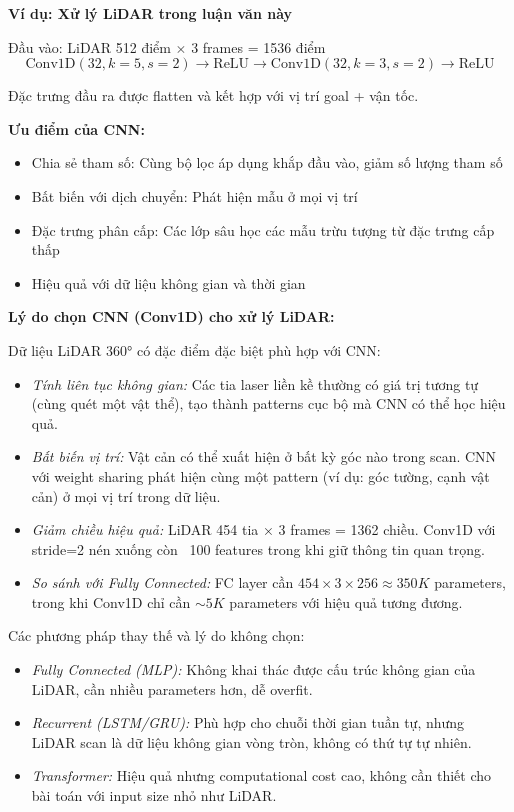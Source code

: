 \textbf{Ví dụ: Xử lý LiDAR trong luận văn này}

Đầu vào: LiDAR 512 điểm $\times$ 3 frames = 1536 điểm
\begin{equation}
\text{Conv1D}(32, k=5, s=2) \rightarrow \text{ReLU} \rightarrow \text{Conv1D}(32, k=3, s=2) \rightarrow \text{ReLU}
\end{equation}

Đặc trưng đầu ra được flatten và kết hợp với vị trí goal + vận tốc.

\textbf{Ưu điểm của CNN:}
\begin{itemize}
\item Chia sẻ tham số: Cùng bộ lọc áp dụng khắp đầu vào, giảm số lượng tham số
\item Bất biến với dịch chuyển: Phát hiện mẫu ở mọi vị trí
\item Đặc trưng phân cấp: Các lớp sâu học các mẫu trừu tượng từ đặc trưng cấp thấp
\item Hiệu quả với dữ liệu không gian và thời gian
\end{itemize}

\textbf{Lý do chọn CNN (Conv1D) cho xử lý LiDAR:}

Dữ liệu LiDAR 360° có đặc điểm đặc biệt phù hợp với CNN:
\begin{itemize}
\item \textit{Tính liên tục không gian:} Các tia laser liền kề thường có giá trị tương tự (cùng quét một vật thể), tạo thành patterns cục bộ mà CNN có thể học hiệu quả.
\item \textit{Bất biến vị trí:} Vật cản có thể xuất hiện ở bất kỳ góc nào trong scan. CNN với weight sharing phát hiện cùng một pattern (ví dụ: góc tường, cạnh vật cản) ở mọi vị trí trong dữ liệu.
\item \textit{Giảm chiều hiệu quả:} LiDAR 454 tia × 3 frames = 1362 chiều. Conv1D với stride=2 nén xuống còn ~100 features trong khi giữ thông tin quan trọng.
\item \textit{So sánh với Fully Connected:} FC layer cần $454 \times 3 \times 256 \approx 350K$ parameters, trong khi Conv1D chỉ cần $\sim 5K$ parameters với hiệu quả tương đương.
\end{itemize}

Các phương pháp thay thế và lý do không chọn:
\begin{itemize}
\item \textit{Fully Connected (MLP):} Không khai thác được cấu trúc không gian của LiDAR, cần nhiều parameters hơn, dễ overfit.
\item \textit{Recurrent (LSTM/GRU):} Phù hợp cho chuỗi thời gian tuần tự, nhưng LiDAR scan là dữ liệu không gian vòng tròn, không có thứ tự tự nhiên.
\item \textit{Transformer:} Hiệu quả nhưng computational cost cao, không cần thiết cho bài toán với input size nhỏ như LiDAR.
\end{itemize}

